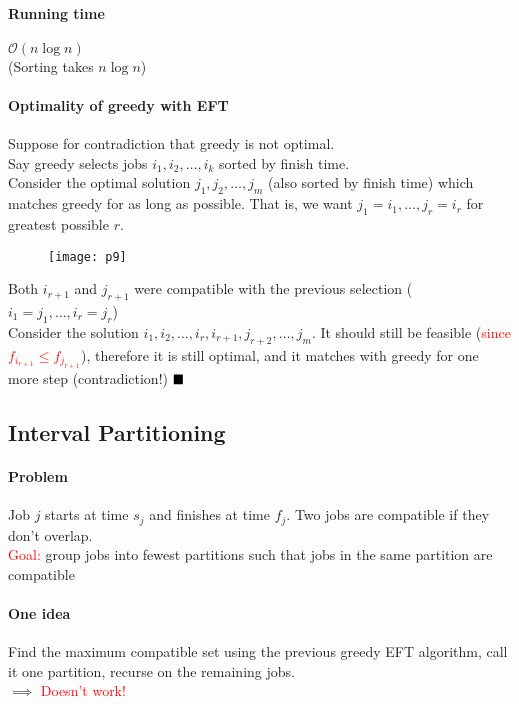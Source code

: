 \documentclass[11pt]{article}
\newcommand{\qed}[0]{$\hfill\blacksquare$}
\begin{document}
\paragraph{Running time}
$\mathcal{O}(n \log n)$ \\
(Sorting takes $n \log n$)

\paragraph{Optimality of greedy with EFT}
Suppose for contradiction that greedy is not optimal. \\
Say greedy selects jobs $i_1, i_2, \hdots, i_k$ sorted by finish time. \\
Consider the optimal solution $j_1, j_2, \hdots, j_m$ (also sorted by finish time) which matches greedy for as long as possible. That is, we want $j_1 = i_1, \hdots, j_r = i_r$ for greatest possible $r$.\\

\begin{figure}[h]
	\centering
	\texttt{[image: p9]}
\end{figure}

\noindent Both $i_{r+1}$ and $j_{r+1}$ were compatible with the previous selection ($i_1 = j_1, \hdots, i_r = j_r$)\\
Consider the solution $i_1, i_2, \hdots, i_r, i_{r+1}, j_{r+2}, \hdots, j_m$. It should still be feasible (\textcolor{red}{since $f_{i_{r+1}} \leq f_{j_{r+1}}$}), therefore it is still optimal, and it matches with greedy for one more step (contradiction!) \qed


\subsection{Interval Partitioning}
\paragraph{Problem}
Job $j$ starts at time $s_j$ and finishes at time $f_j$. Two jobs are compatible if they don't overlap.\\
\textcolor{red}{Goal:} group jobs into fewest partitions such that jobs in the same partition are compatible

\paragraph{One idea}
Find the maximum compatible set using the previous greedy EFT algorithm, call it one partition, recurse on the remaining jobs. \\
$\implies$ \textcolor{red}{Doesn't work!} \\
\end{document}
